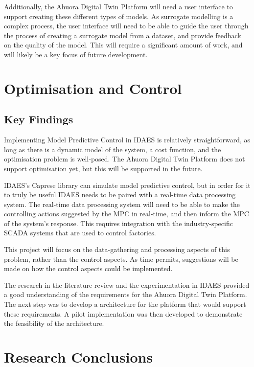 \documentclass[12pt]{report}
\begin{document}
Additionally, the Ahuora Digital Twin Platform will need a user interface to support creating these different types of models. As surrogate modelling is a complex process, the user interface will need to be able to guide the user through the process of creating a surrogate model from a dataset, and provide feedback on the quality of the model. This will require a significant amount of work, and will likely be a key focus of future development.


\section{Optimisation and Control}


\subsection{Key Findings}

Implementing Model Predictive Control in IDAES is relatively straightforward, as long as there is a dynamic model of the system, a cost function, and the optimisation problem is well-posed. The Ahuora Digital Twin Platform does not support optimisation yet, but this will be supported in the future.

IDAES's Caprese library can simulate model predictive control, but in order for it to truly be useful IDAES needs to be paired with a real-time data processing system. The real-time data processing system will need to be able to make the controlling actions suggested by the MPC in real-time, and then inform the MPC of the system's response. This requires integration with the industry-specific SCADA systems that are used to control factories.

This project will focus on the data-gathering and processing aspects of this problem, rather than the control aspects. As time permits, suggestions will be made on how the control aspects could be implemented.



The research in the literature review and the experimentation in IDAES provided a good understanding of the requirements for the Ahuora Digital Twin Platform. The next step was to develop a architecture for the platform that would support these requirements. A pilot implementation was then developed to demonstrate the feasibility of the architecture.

\section{Research Conclusions} \label{sec:researchconclusions}
\end{document}
